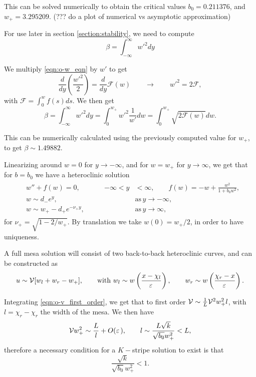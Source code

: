This can be solved numerically to obtain the critical values $b_0 = 0.211376$, and $w_+ = 3.295209$. (??? do a plot of numerical vs asymptotic approximation)

For use later in section \eqref{section:stability}, we need to compute
% 
$$
\beta = \int_{-\infty}^{\infty}w'^2dy
$$
% 

We multiply \eqref{eqn:o-w_eqn} by $w'$ to get 
% 
\begin{equation*}
  \frac{d}{dy}\left(\frac{w'^2}{2} \right)=\frac{d}{dy}\mathcal{F}(w)\qquad\rightarrow\qquad w'^2 = 2\mathcal{F},
\end{equation*}
% 
with $\mathcal{F} = \int_0^wf(s)ds$. We then get
% 
\begin{equation}
\label{eqn:o-beta}
  \beta = \int_{-\infty}^{\infty}w'^2dy = \int_{0}^{w_+}w'^2\frac{1}{w'} dw = \int_{0}^{w_+}\sqrt{2\mathcal{F}(w)}dw.
\end{equation}
% 

This can be numerically calculated using the previously computed value for $w_+$, to get $\beta\sim1.49882$.

Linearizing around $w=0$ for $y\rightarrow -\infty$, and for $w=w_+$ for $y\rightarrow \infty$, we get that for $b=b_0$ we have a heteroclinic solution 
% 
\begin{equation*}
\begin{split}
\begin{aligned}
  &w''+f(w)=0,\qquad &-\infty<y&<\infty,\qquad f(w) = -w + \frac{w^2}{1+b_0w^2},\\
  &w\sim d_-e^y,\qquad &&\mathrm{as}\hspace{2pt}y\rightarrow -\infty,\\
  &w\sim w_+ - d_+e^{-\nu_+y},\qquad&&\mathrm{as}\hspace{2pt}y\rightarrow \infty,
\end{aligned}
\end{split}
\end{equation*}
% 
for $\nu_+ = \sqrt{1-2/w_+}$. By translation we take $w(0)=w_+/2$, in order to have uniqueness.

A full mesa solution will consist of two back-to-back heteroclinic curves, and can be constructed as
% 
\begin{equation*}
  u\sim \mathcal{V}[w_l + w_r - w_+],\qquad  \textrm{with }w_l\sim w\left(\frac{x-\chi_l}{\varepsilon\,}\right),\qquad w_r\sim w\left(\frac{\chi_r-x}{\varepsilon\,}\right).
\end{equation*}
% 

Integrating \eqref{eqn:o-v_first_order}, we get that to first order $\mathcal{V}\sim\frac{1}{L}\mathcal{V}^2w_+^2l$, with $l=\chi_r-\chi_r$ the width of the mesa. We then have
% 
\begin{equation*}
  \mathcal{V} w_+^2\sim\frac{L}{l} + O(\varepsilon\,),\qquad l\sim\frac{L\sqrt{k}}{\sqrt{b_0}w_+^2}<L,
\end{equation*}
% 
therefore a necessary condition for a $K-$stripe solution to exist is that 
% 
\begin{equation*}
  \frac{\sqrt{k}}{\sqrt{b_0}w_+^2}<1.
\end{equation*}
% 

